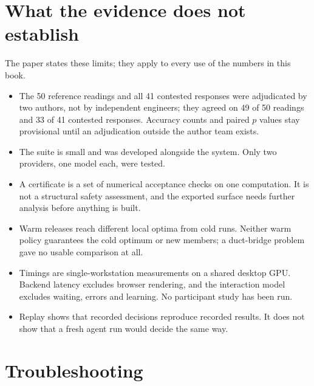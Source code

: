 \section{What the evidence does not establish}\label{sec:validity}
The paper states these limits; they apply to every use of the numbers in this book.
\begin{itemize}
  \item The 50 reference readings and all 41 contested responses were adjudicated by two authors, not by independent
  engineers; they agreed on 49 of 50 readings and 33 of 41 contested responses. Accuracy counts and paired $p$
  values stay provisional until an adjudication outside the author team exists.
  \item The suite is small and was developed alongside the system. Only two providers, one model each, were tested.
  \item A certificate is a set of numerical acceptance checks on one computation. It is not a structural safety
  assessment, and the exported surface needs further analysis before anything is built.
  \item Warm releases reach different local optima from cold runs. Neither warm policy guarantees the cold optimum or new
  members; a duct-bridge problem gave no usable comparison at all.
  \item Timings are single-workstation measurements on a shared desktop GPU. Backend latency excludes browser rendering,
  and the interaction model excludes waiting, errors and learning. No participant study has been run.
  \item Replay shows that recorded decisions reproduce recorded results. It does not show that a fresh agent run would
  decide the same way.
\end{itemize}

\section{Troubleshooting}\label{sec:trouble}

